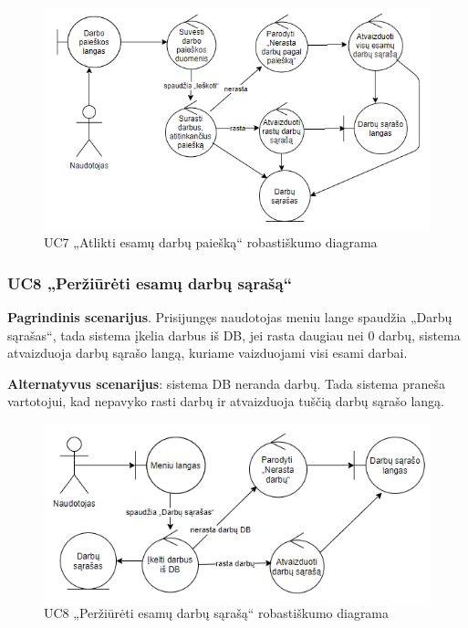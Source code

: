 \documentclass{VUMIFPSbakalaurinis}
\begin{document}
\begin{figure}[H]
	\centering
	\includegraphics[scale=0.6]{img/Robustness/UC7}
	\caption{UC7 „Atlikti esamų darbų paiešką“ robastiškumo diagrama}
	\label{img:uc7rob}
\end{figure}

\subsubsection{UC8 „Peržiūrėti esamų darbų sąrašą“}
\textbf{Pagrindinis scenarijus}. Prisijungęs naudotojas meniu lange spaudžia „Darbų sąrašas“, tada sistema įkelia darbus iš DB, jei rasta daugiau nei 0 darbų, sistema atvaizduoja darbų sąrašo langą, kuriame vaizduojami visi esami darbai.
\par \textbf{Alternatyvus scenarijus}: sistema DB neranda darbų. Tada sistema praneša vartotojui, kad nepavyko rasti darbų ir atvaizduoja tuščią darbų sąrašo langą.

\begin{figure}[H]
	\centering
	\includegraphics[scale=0.6]{img/Robustness/UC8}
	\caption{UC8 „Peržiūrėti esamų darbų sąrašą“ robastiškumo diagrama}
	\label{img:uc8rob}
\end{figure}
\end{document}
